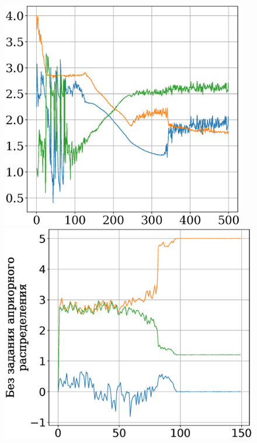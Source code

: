 \documentclass[12pt,twoside]{article}
\begin{document}
\begin{figure}[h]
\begin{minipage}{.32\textwidth}
\end{minipage}
\begin{minipage}{.32\textwidth}
\vspace{2pt}
\hspace{-6.3mm}
      \includegraphics[width = 0.95\textwidth]{912noise.eps}
\end{minipage}
\begin{minipage}{.32\textwidth}
\hspace{-3mm}
      \includegraphics[width = 1.05\textwidth]{900noise.eps}

\end{minipage}
\end{figure}
\end{document}
